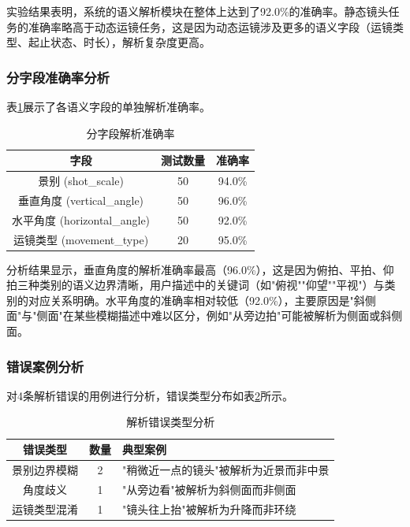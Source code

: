 实验结果表明，系统的语义解析模块在整体上达到了92.0\%的准确率。静态镜头任务的准确率略高于动态运镜任务，这是因为动态运镜涉及更多的语义字段（运镜类型、起止状态、时长），解析复杂度更高。

\subsubsection{分字段准确率分析}

表\ref{tab:field_accuracy}展示了各语义字段的单独解析准确率。

\begin{table}[htbp]
\centering
\caption{分字段解析准确率}
\label{tab:field_accuracy}
\begin{tabular}{ccc}
\toprule
字段 & 测试数量 & 准确率 \\
\midrule
景别 (shot\_scale) & 50 & 94.0\% \\
垂直角度 (vertical\_angle) & 50 & 96.0\% \\
水平角度 (horizontal\_angle) & 50 & 92.0\% \\
运镜类型 (movement\_type) & 20 & 95.0\% \\
\bottomrule
\end{tabular}
\end{table}

分析结果显示，垂直角度的解析准确率最高（96.0\%），这是因为俯拍、平拍、仰拍三种类别的语义边界清晰，用户描述中的关键词（如"俯视""仰望""平视"）与类别的对应关系明确。水平角度的准确率相对较低（92.0\%），主要原因是"斜侧面"与"侧面"在某些模糊描述中难以区分，例如"从旁边拍"可能被解析为侧面或斜侧面。

\subsubsection{错误案例分析}

对4条解析错误的用例进行分析，错误类型分布如表\ref{tab:error_analysis}所示。

\begin{table}[htbp]
\centering
\caption{解析错误类型分析}
\label{tab:error_analysis}
\begin{tabular}{ccp{6cm}}
\toprule
错误类型 & 数量 & 典型案例 \\
\midrule
景别边界模糊 & 2 & "稍微近一点的镜头"被解析为近景而非中景 \\
角度歧义 & 1 & "从旁边看"被解析为斜侧面而非侧面 \\
运镜类型混淆 & 1 & "镜头往上抬"被解析为升降而非环绕 \\
\bottomrule
\end{tabular}
\end{table}


